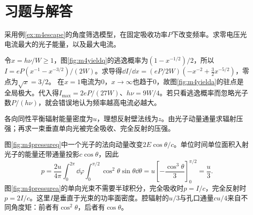 \section{习题与解答}


\begin{exercise}\label{ex:m4yield}
采用例\ref{ex:m4escape}的角度筛选模型，在固定吸收功率$P$下改变频率。求零电压光电流最大的光子能量，以及最大电流。
\end{exercise}
\begin{solution}
令$x=h\nu/W\geq1$，图\ref{fig:m4yieldq}的逃逸概率为$(1-x^{-1/2})/2$，所以$I=eP( x^{-1}-x^{-3/2})/(2W)$。求导得$\dd I/\dd x=(eP/2W)(-x^{-2}+\tfrac32x^{-5/2})$，零点为$\sqrt x=3/2$。
在$x=1$电流为0，$x\to\infty$也趋于0，故图\ref{fig:m4yielda}的驻点是全局极大。代入得$I_{\max}=2eP/(27W)$、$h\nu=9W/4$。若只看逃逸概率而忽略光子数$P/(h\nu)$，就会错误地认为频率越高电流必越大。
\end{solution}

\begin{exercise}\label{ex:m4cavitypressure}
各向同性平衡辐射能量密度为$u$，理想反射壁法线为$z$。由光子动量通量求辐射压强；再求一束垂直单向光被完全吸收、完全反射的压强。
\end{exercise}
\begin{solution}
图\ref{fig:m4pressureq}中一个光子的法向动量改变$2E\cos\theta/c$。单位时间单位面积入射光子的能量还带通量投影$c\cos\theta$，因此
\[
 p=\frac{2u}{4\pi}\int_0^{2\pi}\dd\varphi\int_0^{\pi/2}\cos^2\theta\sin\theta\dd\theta
 =u\left[-\frac{\cos^3\theta}{3}\right]_0^{\pi/2}=\frac u3.
\]
图\ref{fig:m4pressurea}的单向光束不需要半球积分，完全吸收时$p=I/c$，完全反射时$p=2I/c$。这里$I$是垂直于光束的功率面密度。腔辐射的$u/3$与孔口通量$cu/4$来自不同角度矩：前者有$\cos^2\theta$，后者有$\cos\theta$。
\end{solution}

